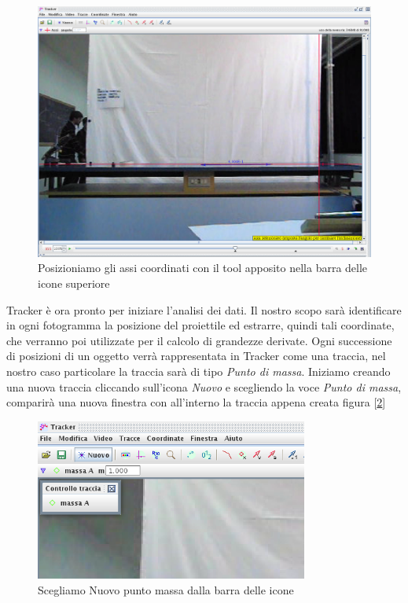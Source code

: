 \documentclass[a4paper,10pt,oneside]{article}
\begin{document}
\begin{figure}[H]
 \centering
 \includegraphics[width=\textwidth]{./immagini/tracker_assi_posizionati.png}
 \caption{Posizioniamo gli assi coordinati con il tool apposito nella barra delle icone superiore}
 \label{fig:assi_coordinati}
\end{figure}

Tracker è ora pronto per iniziare l'analisi dei dati. Il nostro scopo sarà identificare in ogni fotogramma la posizione del proiettile ed estrarre, quindi tali coordinate, che verranno poi utilizzate  per il calcolo di grandezze derivate. Ogni successione di posizioni di un oggetto verrà rappresentata in Tracker come una  traccia, nel nostro caso particolare la traccia sarà di tipo \emph{Punto di massa}. Iniziamo creando una nuova traccia cliccando sull'icona \emph{Nuovo} e scegliendo la voce \emph{Punto di massa}, comparirà una nuova finestra con all'interno la traccia appena creata figura [\ref{fig:nuovo_punto_massa}]

\begin{figure}[H]
 \centering
 \includegraphics[width=0.8\textwidth]{./immagini/tracker_nuovo_punto_massa.png}
 \caption{Scegliamo Nuovo \RIGHTarrow punto massa dalla barra delle icone}
 \label{fig:nuovo_punto_massa}
\end{figure}
\end{document}
